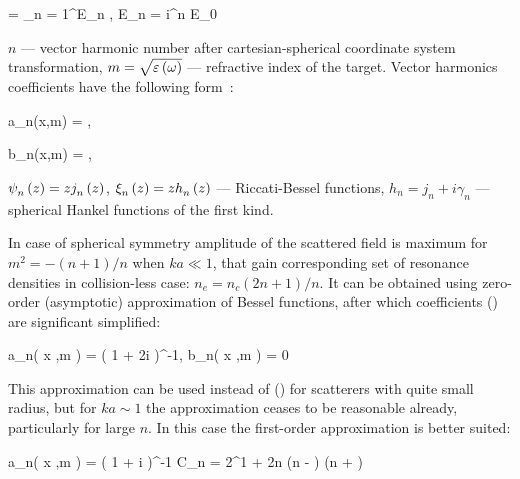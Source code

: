     \eq
		 = \sum_{n = 1}^{\infty}E_n , \qquad E_n = i^{n} E_0 
        \label{E_s_sph}
	\qe

$n$ --- vector harmonic number after cartesian-spherical coordinate system transformation, $m = \sqrt{\varepsilon\left(\omega\right)}$ --- refractive index of the target. Vector harmonics coefficients have the following form~\cite{boren_huffman}:


    \eq
		a_n(x,\:m) = ,
		\label{an_bessel}
	\qe

    \eq
        b_n(x,\:m) = ,
        \label{bn_bessel}
    \qe
    \eqc %
    \cqe %

\noindent ${\psi}_{n}^{} \left({z} \right) = z {j}_{n}^{} \left({z} \right)$, ${\xi}_{n}^{} \left({z} \right) = z {h}_{n}^{} \left({z} \right)$ --- Riccati-Bessel functions, $h_n = j_n + i \gamma_n$ --- spherical Hankel functions of the first kind. 

In case of spherical symmetry amplitude of the scattered field is maximum for $m^2 = - (n+ 1) / n$ when $ka \ll 1$, that gain corresponding set of resonance densities in collision-less case: $n_e = n_c(2n + 1) / n$. It can be obtained using zero-order (asymptotic) approximation of Bessel functions, after which coefficients () are significant simplified:

    \eq
        a_n\left( x ,\:m \right) = \left( 1 + 2i    \right)^{-1}, \qquad b_n\left( x ,\:m \right) = 0
        \label{ab_asymp}
    \qe

This approximation can be used instead of () for scatterers with quite small radius, but for $ka \sim 1$ the approximation ceases to be reasonable already, particularly for large $n$. In this case the first-order approximation is better suited:

    \eq
		a_n\left( x ,\:m \right) = \left( 1 + i  \right)^{-1}
		\label{an_sph_asymp1}
	\qe
	\eqc
		C_n = 2^{1 + 2n} \Gamma(n - ) \Gamma(n + )
	\cqe


